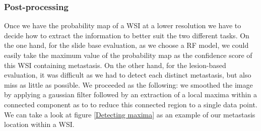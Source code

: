 \documentclass[a4paper,10pt]{article}
\begin{document}
\subsubsection*{Post-processing}

Once we have the probability map of a WSI at a lower resolution we have to decide how to extract the information to better suit the two different tasks. On the one hand, for the slide base evaluation, as we choose a RF model, we could easily take the maximum value of the probability map as the confidence score of this WSI containing metastasis. On the other hand, for the lesion-based evaluation, it was difficult as we had to detect each distinct metastasis, but also miss as little as possible. We proceeded as the following: we smoothed the image by applying a gaussian filter followed by an extraction of a local maxima within a connected component as to to reduce this connected region to a single data point. We can take a look at figure \ref{Detecting maxima} as an example of our metastasis location within a WSI.
\end{document}
